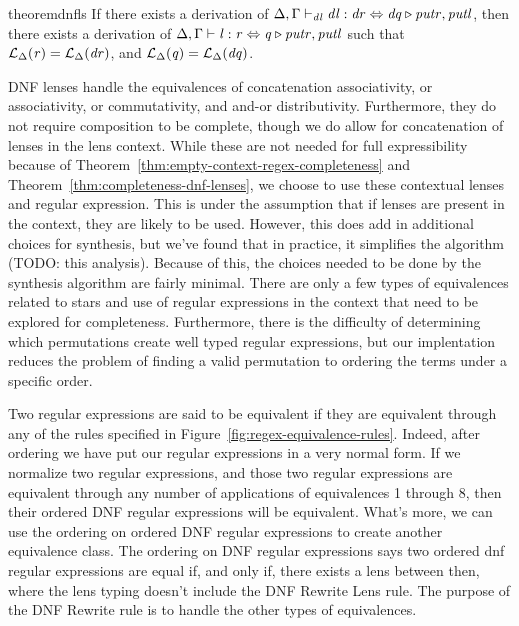 \begin{restatable}{theorem}{dnfls}
\label{thm:soundness-dnf-lenses}
If there exists a derivation of $\Delta, \Gamma \vdash_{\mathit{dl}} \mathit{dl} : \mathit{dr} \Leftrightarrow \mathit{dq} \triangleright \mathit{putr},\mathit{putl}$,
then there exists a derivation of $\Delta, \Gamma \vdash \mathit{l} : \mathit{r} \Leftrightarrow \mathit{q} \triangleright \mathit{putr},\mathit{putl}$ such that
$\mathcal{L}_{\Delta}(\mathit{r})=\mathcal{L}_{\Delta}(\mathit{dr})$, and
$\mathcal{L}_{\Delta}(\mathit{q})=\mathcal{L}_{\Delta}(\mathit{dq})$.
\end{restatable}

DNF lenses handle the equivalences of concatenation associativity,
or associativity, or commutativity, and and-or distributivity.
Furthermore, they do not require composition to be complete,
though we do allow for concatenation of lenses in the lens context.
While these are not needed for full expressibility because of Theorem~\ref{thm:empty-context-regex-completeness}
and Theorem~\ref{thm:completeness-dnf-lenses},
we choose to use these contextual lenses and regular expression.
This is under the assumption that if lenses are present
in the context, they are likely to be used.
However, this does add in additional choices for synthesis, but we've found
that in practice, it simplifies the algorithm (TODO: this analysis).
Because of this, the choices needed to be done by the synthesis algorithm
are fairly minimal.  There are only
a few types of equivalences related to stars and use of regular expressions
in the context that need to be explored for completeness.
Furthermore, there is the difficulty of determining which permutations create
well typed regular expressions, but our implentation reduces the problem of
finding a valid permutation to ordering the terms under a specific order.


Two regular expressions are said to be equivalent if they are equivalent through
any of the rules specified in Figure~\ref{fig:regex-equivalence-rules}.
Indeed, after ordering we have put our regular expressions in a very normal form.
If we normalize two regular expressions, and those two regular expressions are
equivalent through any number of applications of equivalences 1 through 8, then
their ordered DNF regular expressions will be equivalent.
What's more, we can use the ordering on ordered DNF regular expressions to create another
equivalence class.  The ordering on DNF regular expressions says two ordered
dnf regular expressions are equal if, and only if, there exists a lens between
then, where the lens typing doesn't include the DNF Rewrite Lens rule.  The purpose
of the DNF Rewrite rule is to handle the other types of equivalences.




